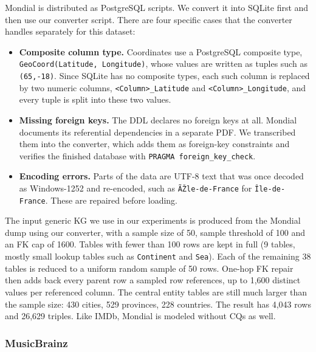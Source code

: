 Mondial is distributed as PostgreSQL scripts. We convert it into SQLite first and then use our converter script. There are four specific cases that the converter handles separately for this dataset:
\begin{itemize}[leftmargin=*, itemsep=2pt]
  \item \textbf{Composite column type.} Coordinates use a PostgreSQL composite type, \texttt{GeoCoord(Latitude, Longitude)}, whose values are written as tuples such as \texttt{(65,-18)}. Since SQLite has no composite types, each such column is replaced by two numeric columns, \texttt{<Column>\_Latitude} and \texttt{<Column>\_Longitude}, and every tuple is split into these two values.
  \item \textbf{Missing foreign keys.} The DDL declares no foreign keys at all. Mondial documents its referential dependencies in a separate PDF\@. We transcribed them into the converter, which adds them as foreign-key constraints and verifies the finished database with \texttt{PRAGMA foreign\_key\_check}.
  \item \textbf{Encoding errors.} Parts of the data are UTF-8 text that was once decoded as Windows-1252 and re-encoded, such as \texttt{ÃŽle-de-France} for \texttt{Île-de-France}. These are repaired before loading.
\end{itemize}
The input generic KG we use in our experiments is produced from the Mondial dump using our converter, with a sample size of 50, sample threshold of 100 and an FK cap of 1600. Tables with fewer than 100 rows are kept in full (9 tables, mostly small lookup tables such as \texttt{Continent} and \texttt{Sea}). Each of the remaining 38 tables is reduced to a uniform random sample of 50 rows. One-hop FK repair then adds back every parent row a sampled row references, up to 1,600 distinct values per referenced column. The central entity tables are still much larger than the sample size: 430 cities, 529 provinces, 228 countries. The result has 4,043 rows and 26,629 triples. Like IMDb, Mondial is modeled without CQs as well.


\subsubsection{MusicBrainz}

